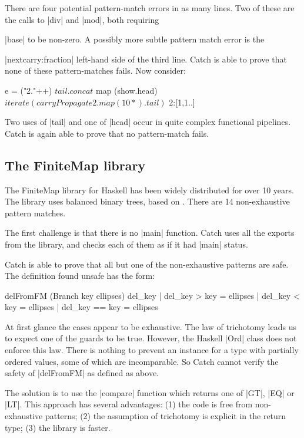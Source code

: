 \noindent There are four potential pattern-match errors in as many lines. Two of these are the calls to |div| and |mod|, both requiring \ignore|base| to be non-zero. A possibly more subtle pattern match error is the \ignore|nextcarry:fraction| left-hand side of the third line. Catch is able to prove that none of these pattern-matches fails. Now consider:

\ignore\begin{code}
e =  ("2."++) $
     tail . concat $
     map (show.head) $
     iterate (carryPropagate 2 . map (10*) . tail) $
     2:[1,1..]
\end{code}

\noindent Two uses of |tail| and one of |head| occur in quite complex functional pipelines. Catch is again able to prove that no pattern-match fails.

\subsection{The FiniteMap library}
\label{secC:finitemap}

The FiniteMap library for Haskell has been widely distributed for over 10 years. The library uses balanced binary trees, based on \cite{adams:sets}. There are 14 non-exhaustive pattern matches.

The first challenge is that there is no |main| function. Catch uses all the exports from the library, and checks each of them as if it had |main| status.

Catch is able to prove that all but one of the non-exhaustive patterns are safe. The definition found unsafe has the form:

\begin{code}
delFromFM (Branch key ellipses) del_key  | del_key  >   key = ellipses
                                         | del_key  <   key = ellipses
                                         | del_key  ==  key = ellipses
\end{code}

At first glance the cases appear to be exhaustive. The law of trichotomy leads us to expect one of the guards to be true. However, the Haskell |Ord| class does not enforce this law. There is nothing to prevent an instance for a type with partially ordered values, some of which are incomparable. So Catch cannot verify the safety of |delFromFM| as defined as above.

The solution is to use the |compare| function which returns one of |GT|, |EQ| or |LT|. This approach has several advantages: (1) the code is free from non-exhaustive patterns; (2) the assumption of trichotomy is explicit in the return type; (3) the library is faster.



